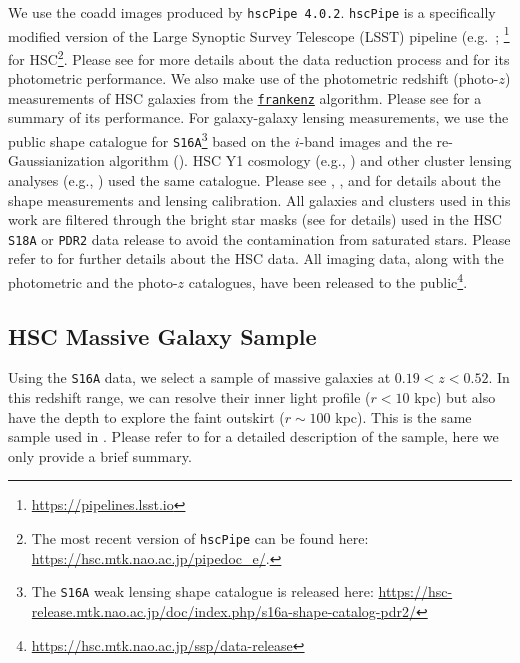 \documentclass[fleqn,usenatbib,useAMS]{mnras}
\begin{document}
    We use the coadd images produced by \texttt{hscPipe 4.0.2}.
    \texttt{hscPipe} is a specifically modified version of the Large Synoptic Survey
    Telescope (LSST) pipeline (e.g.\ \citealt{Juric2015}; 
    \citealt{Axelrod2010}\footnote{{\url{https://pipelines.lsst.io}}} for HSC\footnote{
        The most recent version of \texttt{hscPipe} can be found here:
        \url{https://hsc.mtk.nao.ac.jp/pipedoc_e/}.
    }.
    Please see \citet{HSC-PIPE} for more details about the data reduction process and
    \citet{SynPipe} for its photometric performance.
    We also make use of the photometric redshift (photo-$z$) measurements of HSC galaxies from the
    \href{https://github.com/joshspeagle/frankenz}{\texttt{frankenz}} \citep{Speagle2019} algorithm.
    Please see \citet{HSC-PHOTOZ} for a summary of its performance.
    For galaxy-galaxy lensing measurements, we use the public shape catalogue for 
    \texttt{S16A}\footnote{The \texttt{S16A} weak lensing shape catalogue is released here:
    \url{https://hsc-release.mtk.nao.ac.jp/doc/index.php/s16a-shape-catalog-pdr2/}}
    based on the $i$-band images and the re-Gaussianization algorithm (\citealt{HirataSeljak2003}).
    HSC Y1 cosmology (e.g., \citealt{Hikage2019, Hamana2020}) and other cluster lensing analyses
    (e.g., \citealt{Umetsu2020}) used the same catalogue.
    Please see \citet{HSC-PIPE}, \citet{HSC-WLCAT}, and \citet{HSC-WLCALIB} for details about the
    shape measurements and lensing calibration.
    All galaxies and clusters used in this work are filtered through the bright star masks (see
    \citealt{HSC-STAR} for details) used in the HSC \texttt{S18A} or \texttt{PDR2} data release to
    avoid the contamination from saturated stars.
    Please refer to \citet{Huang2018b, Huang2018c, Huang2020} for further details about the
    HSC data. 
    All imaging data, along with the photometric and the photo-$z$ catalogues, have been released to
    the public\footnote{\url{https://hsc.mtk.nao.ac.jp/ssp/data-release}}.
    
\subsection{HSC Massive Galaxy Sample}
    \label{sec:galaxy_sample}

    Using the \texttt{S16A} data, we select a sample of massive galaxies at $0.19 < z < 0.52$.
    In this redshift range, we can resolve their inner light profile ($r<10$ kpc) but also have the
    depth to explore the faint outskirt ($r \sim 100$ kpc).
    This is the same sample used in \citet{Huang2020}. Please refer to \citet{Huang2020} for a 
    detailed description of the sample, here we only provide a brief summary.
\end{document}
